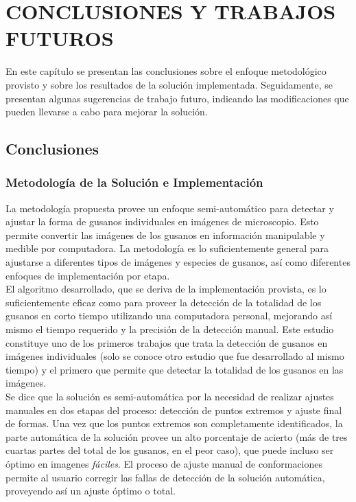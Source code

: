\thispagestyle{empty}
\cleardoublepage
\chapter{CONCLUSIONES Y TRABAJOS FUTUROS}

En este cap\'itulo se presentan las conclusiones sobre el enfoque 
metodol\'ogico provisto y sobre los resultados
de la soluci\'on implementada.
Seguidamente, se presentan algunas sugerencias de
trabajo futuro, indicando las modificaciones que pueden llevarse 
a cabo para mejorar la soluci\'on.

\section{Conclusiones}

\subsection*{Metodolog\'ia de la Soluci\'on e Implementaci\'on}

La metodolog\'ia propuesta provee un enfoque semi-autom\'atico para 
detectar y ajustar la forma de gusanos individuales en im\'agenes
de microscopio. Esto permite convertir las im\'agenes de los gusanos
en informaci\'on manipulable y medible por computadora. La metodolog\'ia
es lo suficientemente general para ajustarse 
a diferentes tipos de im\'agenes y especies de gusanos, as\'i como
diferentes enfoques de implementaci\'on por etapa. \\
El algoritmo desarrollado, que se deriva de la implementaci\'on provista,
es lo suficientemente eficaz como para proveer la detecci\'on de 
la totalidad de los gusanos en corto tiempo utilizando una computadora
personal, mejorando as\'i mismo el tiempo requerido y la precisi\'on
de la detecci\'on manual.
Este estudio constituye uno de los primeros trabajos que trata la detecci\'on de gusanos
en im\'agenes individuales (solo se conoce otro estudio que fue 
desarrollado al mismo tiempo) y el primero que permite que detectar la totalidad de los
gusanos en las im\'agenes.\\

Se dice que la soluci\'on es semi-autom\'atica por la necesidad de 
realizar ajustes manuales en dos etapas del proceso: detecci\'on de
puntos extremos y ajuste final de formas. Una vez que los puntos extremos
son completamente identificados, la parte autom\'atica de la soluci\'on
provee un alto porcentaje de acierto (m\'as de tres cuartas partes
del total de los gusanos, en el peor caso), que puede incluso ser 
\'optimo en imagenes \emph{f\'aciles}. El proceso de ajuste manual
de conformaciones permite al usuario corregir las fallas de detecci\'on de la
soluci\'on autom\'atica, proveyendo as\'i un ajuste \'optimo o total.\\

